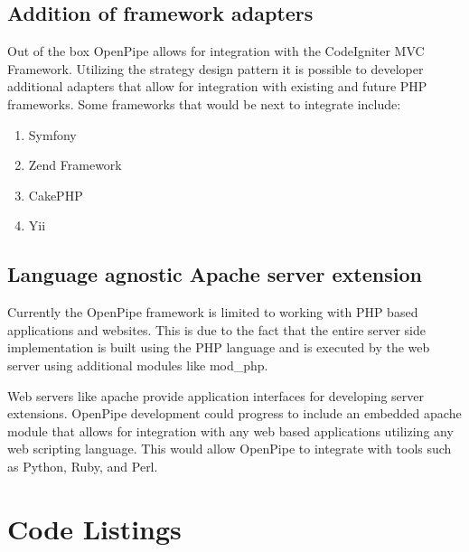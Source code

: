 \documentclass[12pt]{report}
\newcommand{\rootPath}{../../}
\newcommand{\rootServerPath}{\rootPath server/}
\newcommand{\rootServerPhpPath}{\rootServerPath php/}
\newcommand{\rootClientPath}{\rootPath client/}
\newcommand{\rootClientJsPath}{\rootClientPath js/}
\newcommand{\phplist}[1]{}
\newcommand{\jslist}[1]{}
\begin{document}
\section{Addition of framework adapters}
Out of the box OpenPipe allows for integration with the CodeIgniter MVC Framework. Utilizing the strategy design pattern it is possible to developer additional adapters that allow for integration with existing and future PHP frameworks. Some frameworks that would be next to integrate include:

\begin{enumerate}
	\item Symfony
	\item Zend Framework
	\item CakePHP
	\item Yii
\end{enumerate}

\section{Language agnostic Apache server extension}
Currently the OpenPipe framework is limited to working with PHP based applications and websites. This is due to the fact that the entire server side implementation is built  using the PHP language and is executed by the web server using additional modules like mod\_php. 

Web servers like apache provide application interfaces for developing server extensions. OpenPipe development could progress to include an embedded apache module that allows for integration with any web based applications utilizing any web scripting language. This would allow OpenPipe to integrate with tools such as Python, Ruby, and Perl.




\chapter{Code Listings}

\phplist{OpenPipe/Runner.php}
\phplist{OpenPipe/Pipelet/Interface.php}
\phplist{OpenPipe/Pipelet/Abstract.php}
\phplist{OpenPipe/Pipelet/Base.php}
\phplist{OpenPipe/Pipelet/Factory.php}
\phplist{OpenPipe/Output/Interface.php}
\phplist{OpenPipe/Output/Piped.php}
\phplist{OpenPipe/Output/Standard.php}
\phplist{OpenPipe/Output/Util.php}
\phplist{OpenPipe/Adapter/Interface.php}
\phplist{OpenPipe/Adapter/Abstract.php}
\phplist{OpenPipe/Adapter/Basic.php}
\phplist{OpenPipe/Adapter/Pvc/CodeIgniter.php}


\jslist{openpipe.js}
\end{document}
